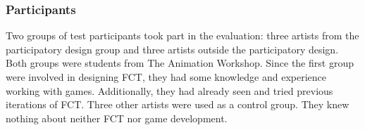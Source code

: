 \subsubsection{Participants}
Two groups of test participants took part in the evaluation: three artists from the participatory design group and three artists outside the participatory design. Both groups were students from The Animation Workshop. Since the first group were involved in designing FCT, they had some knowledge and experience working with games. Additionally, they had already seen and tried previous iterations of FCT. Three other artists were used as a control group. They knew nothing about neither FCT nor game development.
